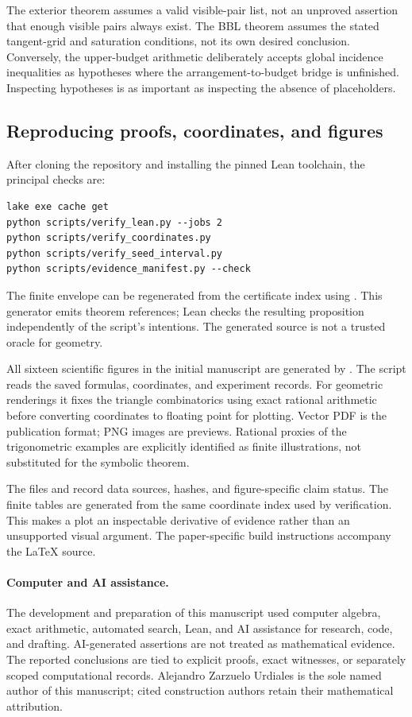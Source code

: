 The exterior theorem assumes a valid visible-pair list, not an unproved assertion that enough visible pairs always exist. The BBL theorem assumes the stated tangent-grid and saturation conditions, not its own desired conclusion. Conversely, the upper-budget arithmetic deliberately accepts global incidence inequalities as hypotheses where the arrangement-to-budget bridge is unfinished. Inspecting hypotheses is as important as inspecting the absence of placeholders.

\subsection{Reproducing proofs, coordinates, and figures}

After cloning the repository and installing the pinned Lean toolchain, the principal checks are:
\begin{lstlisting}
lake exe cache get
python scripts/verify_lean.py --jobs 2
python scripts/verify_coordinates.py
python scripts/verify_seed_interval.py
python scripts/evidence_manifest.py --check
\end{lstlisting}
The finite envelope can be regenerated from the certificate index using . This generator emits theorem references; Lean checks the resulting proposition independently of the script's intentions. The generated source is not a trusted oracle for geometry.

All sixteen scientific figures in the initial manuscript are generated by . The script reads the saved formulas, coordinates, and experiment records. For geometric renderings it fixes the triangle combinatorics using exact rational arithmetic before converting coordinates to floating point for plotting. Vector PDF is the publication format; PNG images are previews. Rational proxies of the trigonometric examples are explicitly identified as finite illustrations, not substituted for the symbolic theorem.

The files  and  record data sources, hashes, and figure-specific claim status. The finite tables are generated from the same coordinate index used by verification. This makes a plot an inspectable derivative of evidence rather than an unsupported visual argument. The paper-specific build instructions accompany the LaTeX source.

\paragraph{Computer and AI assistance.}
The development and preparation of this manuscript used computer algebra, exact arithmetic, automated search, Lean, and AI assistance for research, code, and drafting. AI-generated assertions are not treated as mathematical evidence. The reported conclusions are tied to explicit proofs, exact witnesses, or separately scoped computational records. Alejandro Zarzuelo Urdiales is the sole named author of this manuscript; cited construction authors retain their mathematical attribution.
